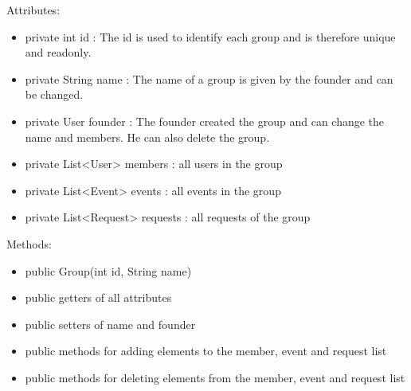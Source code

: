 Attributes:
	\begin{itemize}
	\item private int id : The id is used to identify each group and is therefore unique and readonly.
	\item private String name : The name of a group is given by the founder and can be changed.
	\item private User founder : The founder created the group and can change the name and members. He can also delete the group.
	\item private List<User> members : all users in the group
	\item private List<Event> events : all events in the group
	\item private List<Request> requests  : all requests of the group
	
	\end{itemize}
	Methods:
	\begin{itemize}
	\item public Group(int id, String name)
	\item public getters of all attributes
	\item public setters of name and founder
	\item public methods for adding elements to the member, event and request list
	\item public methods for deleting elements from the member, event and request list
	\end{itemize}

